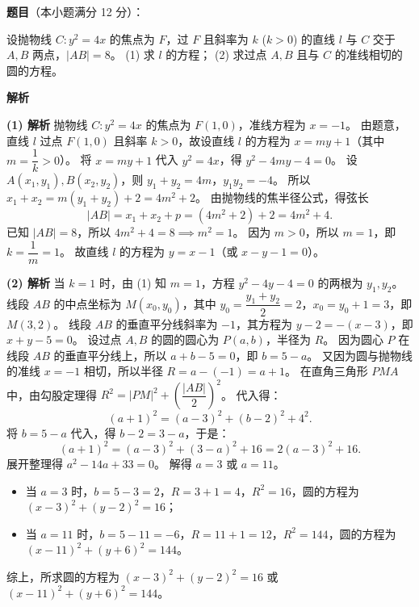 \begin{answer}

\textbf{题目}（本小题满分 12 分）：

设抛物线 $C: y^2=4x$ 的焦点为 $F$，过 $F$ 且斜率为 $k$ ($k>0$) 的直线 $l$ 与 $C$ 交于 $A, B$ 两点，$|AB|=8$。
(1) 求 $l$ 的方程；
(2) 求过点 $A, B$ 且与 $C$ 的准线相切的圆的方程。

\textbf{解析}

\textbf{(1) 解析} 抛物线 $C: y^2=4x$ 的焦点为 $F(1,0)$，准线方程为 $x=-1$。
由题意，直线 $l$ 过点 $F(1,0)$ 且斜率 $k>0$，故设直线 $l$ 的方程为 $x = my+1$（其中 $m = \dfrac1k > 0$）。
将 $x = my+1$ 代入 $y^2=4x$，得 $y^2 - 4my - 4 = 0$。
设 $A(x_1, y_1), B(x_2, y_2)$，则 $y_1+y_2 = 4m$，$y_1y_2 = -4$。
所以 $x_1+x_2 = m(y_1+y_2)+2 = 4m^2+2$。
由抛物线的焦半径公式，得弦长
\nopagebreak[4]
\[|AB| = x_1+x_2+p = (4m^2+2) + 2 = 4m^2+4.\]
已知 $|AB|=8$，所以 $4m^2+4 = 8 \implies m^2=1$。
因为 $m>0$，所以 $m=1$，即 $k = \dfrac1m = 1$。
故直线 $l$ 的方程为 $y = x-1$（或 $x-y-1=0$）。

\textbf{(2) 解析} 当 $k=1$ 时，由 (1) 知 $m=1$，方程 $y^2-4y-4=0$ 的两根为 $y_1, y_2$。
线段 $AB$ 的中点坐标为 $M(x_0, y_0)$，其中 $y_0 = \dfrac{y_1+y_2}{2} = 2$，$x_0 = y_0+1 = 3$，即 $M(3,2)$。
线段 $AB$ 的垂直平分线斜率为 $-1$，其方程为 $y - 2 = -(x - 3)$，即 $x+y-5=0$。
设过点 $A, B$ 的圆的圆心为 $P(a, b)$，半径为 $R$。
因为圆心 $P$ 在线段 $AB$ 的垂直平分线上，所以 $a+b-5=0$，即 $b = 5-a$。
又因为圆与抛物线的准线 $x=-1$ 相切，所以半径 $R = a - (-1) = a+1$。
在直角三角形 $PMA$ 中，由勾股定理得 $R^2 = |PM|^2 + \left(\dfrac{|AB|}{2}\right)^2$。
代入得：
\nopagebreak[4]
\[(a+1)^2 = (a-3)^2 + (b-2)^2 + 4^2.\]
将 $b = 5-a$ 代入，得 $b-2 = 3-a$，于是：
\nopagebreak[4]
\[(a+1)^2 = (a-3)^2 + (3-a)^2 + 16 = 2(a-3)^2 + 16.\]
展开整理得 $a^2 - 14a + 33 = 0$。
解得 $a=3$ 或 $a=11$。
\begin{itemize}
\item 当 $a=3$ 时，$b = 5-3=2$，$R = 3+1=4$，$R^2=16$，圆的方程为 $(x-3)^2+(y-2)^2=16$；
\item 当 $a=11$ 时，$b = 5-11=-6$，$R = 11+1=12$，$R^2=144$，圆的方程为 $(x-11)^2+(y+6)^2=144$。
\end{itemize}
综上，所求圆的方程为 $(x-3)^2+(y-2)^2=16$ 或 $(x-11)^2+(y+6)^2=144$。



\end{answer}
